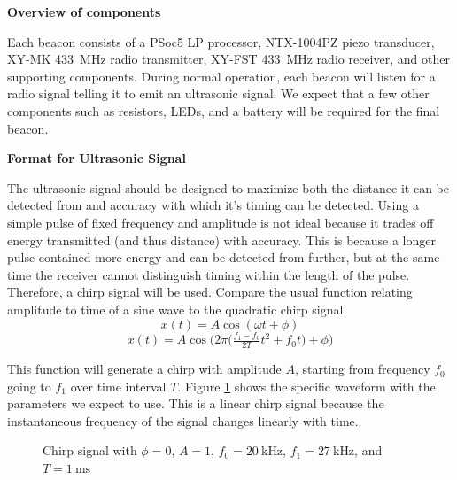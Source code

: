 \documentclass{article}
\begin{document}
      \textbf{Overview of components}

      Each beacon consists of a PSoc5 LP processor, NTX-1004PZ piezo transducer, XY-MK \SI{433}{\mega\hertz} radio transmitter, XY-FST \SI{433}{\mega\hertz} radio receiver, and other supporting components. During normal operation, each beacon will listen for a radio signal telling it to emit an ultrasonic signal. We expect that a few other components such as resistors, LEDs, and a battery will be required for the final beacon.

      \textbf{Format for Ultrasonic Signal}

      The ultrasonic signal should be designed to maximize both the distance it can be detected from and accuracy with which it's timing can be detected. Using a simple pulse of fixed frequency and amplitude is not ideal because it trades off energy transmitted (and thus distance) with accuracy. This is because a longer pulse contained more energy and can be detected from further, but at the same time the receiver cannot distinguish timing within the length of the pulse. Therefore, a chirp signal will be used. Compare the usual function relating amplitude to time of a sine wave to the quadratic chirp signal.
      $$ x(t) = A\cos(\omega t + \phi) $$
      $$ x(t) = A\cos\bigg(2\pi\Big(\tfrac{f_1 - f_0}{2T}t^2+f_0t\Big) + \phi\bigg) $$

      This function will generate a chirp with amplitude $A$, starting from frequency $f_0$ going to $f_1$ over time interval $T$. Figure \ref{fig:chirp} shows the specific waveform with the parameters we expect to use. This is a linear chirp signal because the instantaneous frequency of the signal changes linearly with time.

      \begin{figure}[H]
        \centering
        \label{fig:chirp}
        \caption{Chirp signal with $\phi=0$, $A=1$, $f_0=\SI{20}{\kilo\hertz}$, $f_1=\SI{27}{\kilo\hertz}$, and $T=\SI{1}{\milli\second}$}
      \end{figure}
\end{document}
